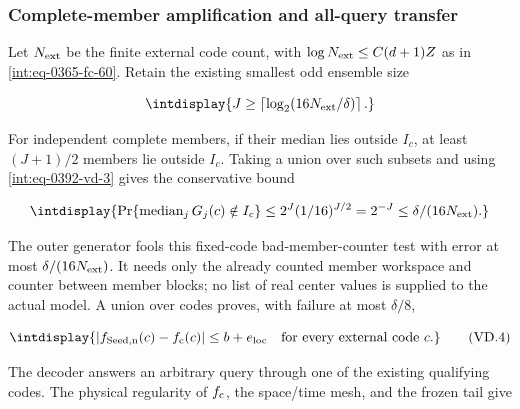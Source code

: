 \subsubsection{Complete-member amplification and all-query transfer}



Let \(N_{\rm ext}\) be the finite external code count, with \(\log N_{\rm ext}\le C(d+1)Z\) as in \eqref{int:eq-0365-fc-60}. Retain the existing smallest odd ensemble size


\begingroup\renewcommand{\theHequation}{intdisplay.809}
\begin{equation*}
\intdisplay{
J\ge\left\lceil\log_2(16N_{\rm ext}/\delta)\right\rceil.
}
\end{equation*}
\endgroup


For independent complete members, if their median lies outside \(I_c\), at least \((J+1)/2\) members lie outside \(I_c\). Taking a union over such subsets and using \eqref{int:eq-0392-vd-3} gives the conservative bound


\begingroup\renewcommand{\theHequation}{intdisplay.810}
\begin{equation*}
\intdisplay{
\Pr\{\operatorname{median}_j G_j(c)\notin I_c\}
 \le2^J(1/16)^{J/2}=2^{-J}
 \le\delta/(16N_{\rm ext}).
}
\end{equation*}
\endgroup


The outer generator fools this fixed-code bad-member-counter test with error at most \(\delta/(16N_{\rm ext})\). It needs only the already counted member workspace and counter between member blocks; no list of real center values is supplied to the actual model. A union over codes proves, with failure at most \(\delta/8\),


\begingroup\renewcommand{\theHequation}{intdisplay.811}
\begin{equation}
\intdisplay{
|f_{\rm Seed,n}(c)-f_{\rm c}(c)|\le b+e_{\rm loc}
\quad\hbox{for every external code }c.
}
\tag{VD.4}
\label{int:eq-0393-vd-4}
\end{equation}
\endgroup


The decoder answers an arbitrary query through one of the existing qualifying codes. The physical regularity of \(f_{\rm c}\), the space/time mesh, and the frozen tail give


